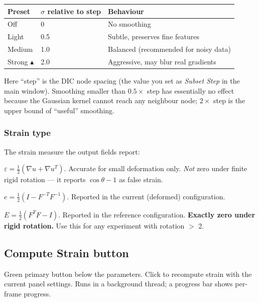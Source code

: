 \begin{center}
\begin{tabular}{lll}
  \toprule
  Preset & $\sigma$ relative to step & Behaviour \\
  \midrule
  Off                  & 0    & No smoothing \\
  Light                & 0.5  & Subtle, preserves fine features \\
  Medium               & 1.0  & Balanced (recommended for noisy data) \\
  Strong $\blacktriangle$ & 2.0 & Aggressive, may blur real gradients \\
  \bottomrule
\end{tabular}
\end{center}

Here ``step'' is the DIC node spacing (the value you set as
\emph{Subset Step} in the main window). Smoothing smaller than
$0.5 \times $ step has essentially no effect because the Gaussian
kernel cannot reach any neighbour node; $2 \times $ step is the
upper bound of ``useful'' smoothing.

\subsubsection*{Strain type}

The strain measure the output fields report:

\begin{description}[leftmargin=1.2cm,style=nextline]
  \item[Infinitesimal (default)]
    $\varepsilon = \frac{1}{2}(\nabla u + \nabla u^T)$. Accurate for
    small deformation only. \emph{Not} zero under finite rigid
    rotation --- it reports $\cos\theta - 1$ as false strain.
  \item[Eulerian--Almansi]
    $e = \frac{1}{2}(I - F^{-T} F^{-1})$. Reported in the current
    (deformed) configuration.
  \item[Green--Lagrangian]
    $E = \frac{1}{2}(F^T F - I)$. Reported in the reference
    configuration. \textbf{Exactly zero under rigid rotation.} Use
    this for any experiment with rotation $>$ 2\textdegree{}.
\end{description}

\subsection{Compute Strain button}

Green primary button below the parameters. Click to recompute strain
with the current panel settings. Runs in a background thread; a
progress bar shows per-frame progress.

